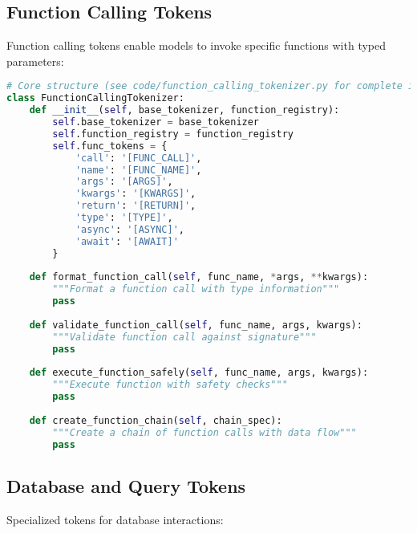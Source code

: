 \subsection{Function Calling Tokens}

Function calling tokens enable models to invoke specific functions with typed parameters:

\begin{lstlisting}[language=Python, caption=Function calling token system]
# Core structure (see code/function_calling_tokenizer.py for complete implementation)
class FunctionCallingTokenizer:
    def __init__(self, base_tokenizer, function_registry):
        self.base_tokenizer = base_tokenizer
        self.function_registry = function_registry
        self.func_tokens = {
            'call': '[FUNC_CALL]',
            'name': '[FUNC_NAME]',
            'args': '[ARGS]',
            'kwargs': '[KWARGS]',
            'return': '[RETURN]',
            'type': '[TYPE]',
            'async': '[ASYNC]',
            'await': '[AWAIT]'
        }
    
    def format_function_call(self, func_name, *args, **kwargs):
        """Format a function call with type information"""
        pass
    
    def validate_function_call(self, func_name, args, kwargs):
        """Validate function call against signature"""
        pass
    
    def execute_function_safely(self, func_name, args, kwargs):
        """Execute function with safety checks"""
        pass
    
    def create_function_chain(self, chain_spec):
        """Create a chain of function calls with data flow"""
        pass
\end{lstlisting}

\subsection{Database and Query Tokens}

Specialized tokens for database interactions:

